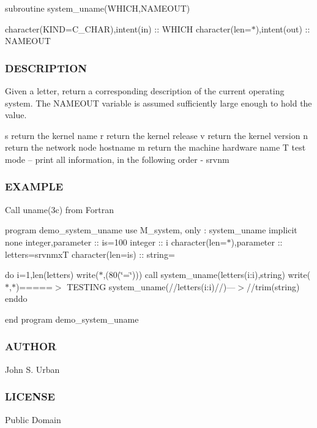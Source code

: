 subroutine system\+\_\+uname(\+W\+H\+I\+C\+H,\+N\+A\+M\+E\+O\+U\+T)

character(K\+I\+ND=C\+\_\+\+C\+H\+AR),intent(in) \+:\+: W\+H\+I\+CH character(len=$\ast$),intent(out) \+:\+: N\+A\+M\+E\+O\+UT \subsubsection*{D\+E\+S\+C\+R\+I\+P\+T\+I\+ON}

Given a letter, return a corresponding description of the current operating system. The N\+A\+M\+E\+O\+UT variable is assumed sufficiently large enough to hold the value.

s return the kernel name r return the kernel release v return the kernel version n return the network node hostname m return the machine hardware name T test mode -- print all information, in the following order -\/ srvnm

\subsubsection*{E\+X\+A\+M\+P\+LE}

Call uname(3c) from Fortran

program demo\+\_\+system\+\_\+uname use M\+\_\+system, only \+: system\+\_\+uname implicit none integer,parameter \+:\+: is=100 integer \+:\+: i character(len=$\ast$),parameter \+:\+: letters=\textquotesingle{}srvnmxT\textquotesingle{} character(len=is) \+:\+: string=\textquotesingle{} \textquotesingle{}

do i=1,len(letters) write($\ast$,\textquotesingle{}(80(\char`\"{}=\char`\"{}))\textquotesingle{}) call system\+\_\+uname(letters(i\+:i),string) write($\ast$,$\ast$)\textquotesingle{}=====$>$ T\+E\+S\+T\+I\+NG system\+\_\+uname(\textquotesingle{}//letters(i\+:i)//\textquotesingle{})---$>$\textquotesingle{}//trim(string) enddo

end program demo\+\_\+system\+\_\+uname \subsubsection*{A\+U\+T\+H\+OR}

John S. Urban \subsubsection*{L\+I\+C\+E\+N\+SE}

Public Domain \mbox{\label{namespacem__system_a3561c9beafec28439f760d701d55a6b8}} 
